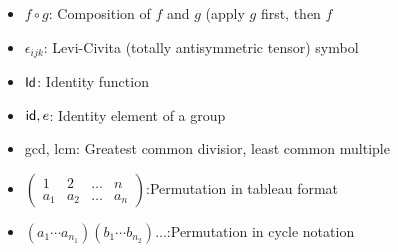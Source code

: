 \begin{itemize}
\item[]
$f \circ g$: \quad Composition of $f$ and $g$ (apply $g$ first, then $f$
\item[]
$\epsilon_{ijk}$: \quad Levi-Civita (totally antisymmetric tensor) symbol
\item[]
${\sf{I}d}$: \quad Identity function
\item[]
${\sf{i}d}, e$: \quad Identity element of a group
\item[]
gcd, lcm: \quad Greatest common divisior, least common multiple
\item[]
$\begin{pmatrix} 1 & 2 & \ldots & n\\ a_1 & a_2 & \ldots & a_n \end{pmatrix}$:\quad Permutation in tableau format
\item[]
$(a_1 \cdots a_{n_1})(b_1 \cdots b_{n_2}) \ldots $:\quad Permutation in cycle notation
\end{itemize}

